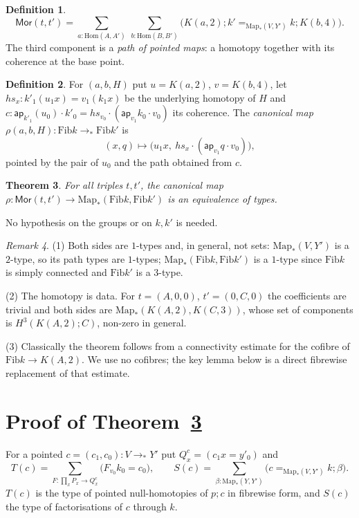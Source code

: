 \documentclass[11pt]{amsart}
\newtheorem{theorem}{Theorem}
\theoremstyle{definition}
\newtheorem{definition}[theorem]{Definition}
\theoremstyle{remark}
\newtheorem{remark}[theorem]{Remark}
\newcommand{\ap}{\mathsf{ap}}
\newcommand{\Fib}{\mathrm{Fib}}
\newcommand{\Mor}{\mathsf{Mor}}
\newcommand{\Hom}{\mathrm{Hom}}
\newcommand{\Map}{\mathrm{Map}_*}
\newcommand{\rmap}{\rho}
\newcommand{\cmp}{\mathbin{;}}
\begin{document}
\begin{definition}\label{def:mor}
\[\Mor(t,t')=\sum_{a:\Hom(A,A')}\ \sum_{b:\Hom(B,B')}
 \big(K(a,2)\cmp k'=_{\Map(V,Y')}k\cmp K(b,4)\big).\]
The third component is a \emph{path of pointed maps}: a homotopy together with
its coherence at the base point.
\end{definition}

\begin{definition}\label{def:rmap}
For $(a,b,H)$ put $u=K(a,2)$, $v=K(b,4)$, let $hs_x:k'_1(u_1x)=v_1(k_1x)$ be the
underlying homotopy of $H$ and $c:\ap_{k'_1}(u_0)\cdot k'_0=hs_{v_0}\cdot(\ap_{v_1}k_0\cdot v_0)$
its coherence. The \emph{canonical map}
$\rmap(a,b,H):\Fib k\to_*\Fib k'$ is
\[(x,q)\longmapsto\big(u_1x,\ hs_x\cdot(\ap_{v_1}q\cdot v_0)\big),\]
pointed by the pair of $u_0$ and the path obtained from $c$.
\end{definition}

\begin{theorem}\label{thm:main}
For all triples $t,t'$, the canonical map $\rmap:\Mor(t,t')\to\Map(\Fib k,\Fib k')$
is an equivalence of types.
\end{theorem}

\noindent No hypothesis on the groups or on $k,k'$ is needed.

\begin{remark}
(1) Both sides are $1$-types and, in general, not sets: $\Map(V,Y')$ is a
$2$-type, so its path types are $1$-types; $\Map(\Fib k,\Fib k')$ is a
$1$-type since $\Fib k$ is simply connected and $\Fib k'$ is a $3$-type.

(2) The homotopy is data. For $t=(A,0,0)$, $t'=(0,C,0)$ the coefficients are
trivial and both sides are $\Map(K(A,2),K(C,3))$, whose set of components is
$H^3(K(A,2);C)$, non-zero in general.

(3) Classically the theorem follows from a connectivity estimate for the
cofibre of $\Fib k\to K(A,2)$. We use no cofibres; the key lemma below is a
direct fibrewise replacement of that estimate.
\end{remark}

\section{Proof of Theorem~\ref{thm:main}}

For a pointed $c=(c_1,c_0):V\to_*Y'$ put $Q^c_x=(c_1x=y'_0)$ and
\[T(c)=\sum_{F:\prod_x P_x\to Q^c_x}\big(F_{v_0}k_0=c_0\big),\qquad
S(c)=\sum_{\beta:\Map(Y,Y')}\big(c=_{\Map(V,Y')}k\cmp\beta\big).\]
$T(c)$ is the type of pointed null-homotopies of $p\cmp c$ in fibrewise form,
and $S(c)$ the type of factorisations of $c$ through $k$.
\end{document}
